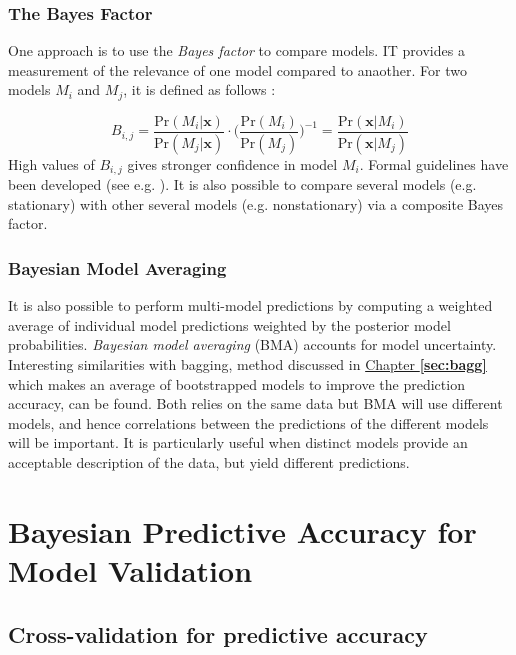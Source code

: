 \subsubsection*{The Bayes Factor}

One approach is to use the \emph{Bayes factor}
to compare models. IT provides a measurement of the relevance of one model compared to anaother. For two models $M_i$ and $M_j$, it is defined as follows : 

\begin{equation}
B_{i,j}=\frac{\text{Pr}(M_i|\boldsymbol{x})}{\text{Pr}(M_j|\boldsymbol{x})}\cdot \Bigg(\frac{\text{Pr}(M_i)}{\text{Pr}(M_j)}\Bigg)^{-1}= \frac{\text{Pr}(\boldsymbol{x}|M_i)}{\text{Pr}(\boldsymbol{x}|M_j)}
\end{equation}
High values of $B_{i,j}$ gives stronger confidence in model $M_i$. Formal guidelines have been developed (see e.g. \citet{robert_1995}). It is also possible to compare several models (e.g. stationary) with other several models (e.g. nonstationary) via a composite Bayes factor.


\subsubsection*{Bayesian Model Averaging}

It is also possible to perform multi-model predictions by computing a weighted average of individual model predictions weighted by the posterior model probabilities. 
\emph{Bayesian model averaging} (BMA) accounts for model uncertainty. Interesting similarities with bagging, method discussed in \hyperref[sec:bagg]{Chapter \textbf{\ref{sec:bagg}}} which makes an average of bootstrapped models to improve the prediction accuracy, can be found. Both relies on the same data but BMA will use different models, and hence correlations between the predictions of the different models will be important. It is particularly useful when distinct models provide an acceptable description of the data, but yield different predictions.



\section{Bayesian Predictive Accuracy for Model Validation}



\subsection{Cross-validation for predictive accuracy}

